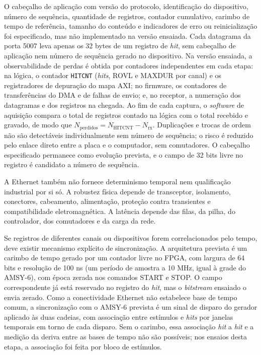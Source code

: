 O cabeçalho de aplicação com versão do protocolo, identificação do dispositivo, número de sequência, quantidade de registros, contador cumulativo, carimbo de tempo de referência, tamanho do conteúdo e indicadores de erro ou reinicialização foi especificado, mas não implementado na versão ensaiada. Cada datagrama da porta 5007 leva apenas os 32 bytes de um registro de \textit{hit}, sem cabeçalho de aplicação nem número de sequência gerado no dispositivo. Na versão ensaiada, a observabilidade de perdas é obtida por contadores independentes em cada etapa: na lógica, o contador \texttt{HITCNT} (\textit{hits}, ROVL e MAXDUR por canal) e os registradores de depuração do mapa AXI; no firmware, os contadores de transferências do DMA e de falhas de envio; e, no receptor, a numeração dos datagramas e dos registros na chegada. Ao fim de cada captura, o \textit{software} de aquisição compara o total de registros contado na lógica com o total recebido e gravado, de modo que \(N_{\mathrm{perdidos}} = N_{\mathrm{HITCNT}} - N_{\mathrm{rx}}\). Duplicações e trocas de ordem não são detectáveis individualmente sem número de sequência; o risco é reduzido pelo enlace direto entre a placa e o computador, sem comutadores. O cabeçalho especificado permanece como evolução prevista, e o campo de 32 bits livre no registro é candidato a número de sequência.

A Ethernet também não fornece determinismo temporal nem qualificação industrial por si só. A robustez física depende de transceptor, isolamento, conectores, cabeamento, alimentação, proteção contra transientes e compatibilidade eletromagnética. A latência depende das filas, da pilha, do controlador, dos comutadores e da carga da rede.

Se registros de diferentes canais ou dispositivos forem correlacionados pelo tempo, deve existir mecanismo explícito de sincronização. A arquitetura prevista é um carimbo de tempo gerado por um contador livre no FPGA, com largura de 64 bits e resolução de 100 ns (um período de amostra a 10 MHz, igual à grade do AMSY-6), com época zerada nos comandos START e STOP. O campo correspondente já está reservado no registro do \textit{hit}, mas o \textit{bitstream} ensaiado o envia zerado. Como a conectividade Ethernet não estabelece base de tempo comum, a sincronização com o AMSY-6 prevista é um sinal de disparo do gerador aplicado às duas cadeias, com associação entre estímulos e \textit{hits} por janelas temporais em torno de cada disparo. Sem o carimbo, essa associação \textit{hit} a \textit{hit} e a medição da deriva entre as bases de tempo não são possíveis; nos ensaios desta etapa, a associação foi feita por bloco de estímulos.

